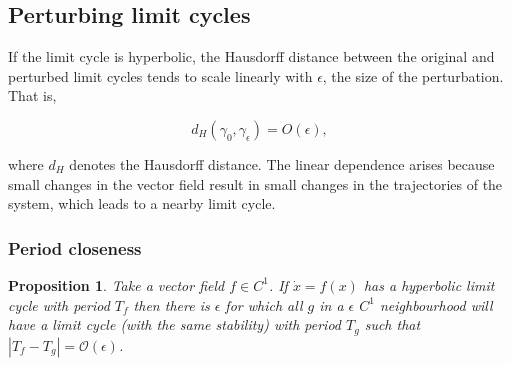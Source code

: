 \documentclass{article}
\newtheorem{proposition}{Proposition}
\theoremstyle{definition} \newtheorem{definition}{Definition}
\theoremstyle{remark} \newtheorem{remark}{Remark}
\newcommand{\cl}{\operatorname{cl}}
\newcommand{\boa}{\operatorname{BoA}}
\newcounter{ct}
\begin{document}



\subsection{Perturbing limit cycles}\label{sec:lc_pert}
If the limit cycle is hyperbolic, the Hausdorff distance between the original and perturbed limit cycles tends to scale linearly with \(\epsilon\), the size of the perturbation. That is,

\[
d_H(\gamma_0, \gamma_\epsilon) = O(\epsilon),
\]

where \(d_H\) denotes the Hausdorff distance. The linear dependence arises because small changes in the vector field result in small changes in the trajectories of the system, which leads to a nearby limit cycle.


\subsubsection{Period closeness}\label{sec:periodcloseness}
\begin{proposition}\label{prop:periodcloseness}%
Take a vector field $f\in C^1$.
If $\dot x = f(x)$ has a hyperbolic limit cycle with period $T_f$ then there is $\epsilon$ for which all $g$ in a $\epsilon$ $C^1$ neighbourhood will have a limit cycle (with the same stability) with period $T_g$ such that  $|T_f-T_g| = \mathcal{O}(\epsilon)$.
\end{proposition}
\end{document}
